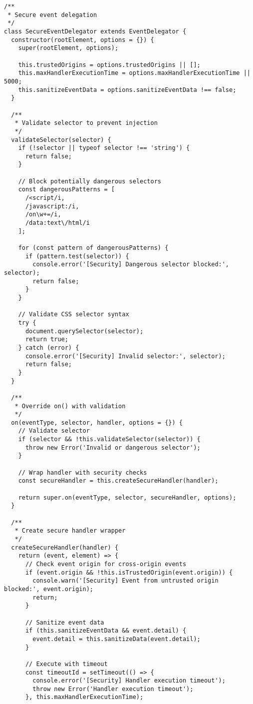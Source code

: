 \documentclass[11pt]{article}
\begin{document}
\begin{verbatim}
/**
 * Secure event delegation
 */
class SecureEventDelegator extends EventDelegator {
  constructor(rootElement, options = {}) {
    super(rootElement, options);
    
    this.trustedOrigins = options.trustedOrigins || [];
    this.maxHandlerExecutionTime = options.maxHandlerExecutionTime || 5000;
    this.sanitizeEventData = options.sanitizeEventData !== false;
  }
  
  /**
   * Validate selector to prevent injection
   */
  validateSelector(selector) {
    if (!selector || typeof selector !== 'string') {
      return false;
    }
    
    // Block potentially dangerous selectors
    const dangerousPatterns = [
      /<script/i,
      /javascript:/i,
      /on\w+=/i,
      /data:text\/html/i
    ];
    
    for (const pattern of dangerousPatterns) {
      if (pattern.test(selector)) {
        console.error('[Security] Dangerous selector blocked:', selector);
        return false;
      }
    }
    
    // Validate CSS selector syntax
    try {
      document.querySelector(selector);
      return true;
    } catch (error) {
      console.error('[Security] Invalid selector:', selector);
      return false;
    }
  }
  
  /**
   * Override on() with validation
   */
  on(eventType, selector, handler, options = {}) {
    // Validate selector
    if (selector && !this.validateSelector(selector)) {
      throw new Error('Invalid or dangerous selector');
    }
    
    // Wrap handler with security checks
    const secureHandler = this.createSecureHandler(handler);
    
    return super.on(eventType, selector, secureHandler, options);
  }
  
  /**
   * Create secure handler wrapper
   */
  createSecureHandler(handler) {
    return (event, element) => {
      // Check event origin for cross-origin events
      if (event.origin && !this.isTrustedOrigin(event.origin)) {
        console.warn('[Security] Event from untrusted origin blocked:', event.origin);
        return;
      }
      
      // Sanitize event data
      if (this.sanitizeEventData && event.detail) {
        event.detail = this.sanitizeData(event.detail);
      }
      
      // Execute with timeout
      const timeoutId = setTimeout(() => {
        console.error('[Security] Handler execution timeout');
        throw new Error('Handler execution timeout');
      }, this.maxHandlerExecutionTime);
      

\end{verbatim}
\end{document}
